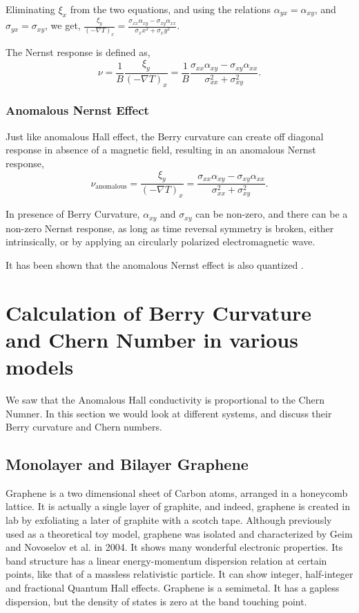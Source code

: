 \documentclass{report}
\begin{document}
Eliminating $\xi_x$ from the two equations, and using the relations $\alpha_{y x} = \alpha_{x y}$, and $\sigma_{y x} = \sigma_{x y}$, we get, $\frac{\xi_y}{(-\nabla T)_x} = \frac{\sigma_{xx} \alpha_{xy} - \sigma_{xy} \alpha_{xx}}{\sigma_xx ^2 + \sigma_xy ^2}$.

The Nernst response is defined \cite{Ussishkin_2002} as,
$$\nu = \frac{1}{B} \frac{\xi_y}{(-\nabla T)_x} = \frac{1}{B} \frac{\sigma_{xx} \alpha_{xy} - \sigma_{xy} \alpha_{xx}}{\sigma_{xx} ^2 + \sigma_{xy} ^2}.$$



\subsection{Anomalous Nernst Effect}
Just like anomalous Hall effect, the Berry curvature can create off diagonal response in absence of a magnetic field, resulting in an anomalous Nernst response,
$$\nu_\text{anomalous} = \frac{\xi_y}{(-\nabla T)_x} = \frac{\sigma_{xx} \alpha_{xy} - \sigma_{xy} \alpha_{xx}}{\sigma_{xx} ^2 + \sigma_{xy} ^2}.$$

In presence of Berry Curvature, $\alpha_{xy}$ and $\sigma_{xy}$ can be non-zero, and there can be a non-zero Nernst response, as long as time reversal symmetry is broken, either intrinsically, or by applying an circularly polarized electromagnetic wave.

It has been shown that the anomalous Nernst effect is also quantized \cite{QuantizedNernstNoky_2021}.
\chapter{Calculation of Berry Curvature and Chern Number in various models}\label{chap:ChernNumber}
We saw that the Anomalous Hall conductivity is proportional to the Chern Numner. In this section we would look at different systems, and discuss their Berry curvature and Chern numbers.
\section{Monolayer and Bilayer Graphene}
Graphene is a two dimensional sheet of Carbon atoms, arranged in a honeycomb lattice. It is actually a single layer of graphite, and indeed, graphene is created in lab by exfoliating a later of graphite with a scotch tape. Although previously used as a theoretical toy model, graphene was isolated and characterized by Geim and Novoselov et al. \cite{NovoselovGeimGraphene666} in 2004. It shows many wonderful electronic properties. Its band structure has a linear energy-momentum dispersion \cite{NovoselovGrapheneDirac2005} relation at certain points, like that of a massless relativistic particle. It can show integer, half-integer \cite{Zhang2005GrapheneQHEBerry} and fractional \cite{Bolotin2009GrapheneFQHE} Quantum Hall effects. Graphene is a semimetal. It has a gapless dispersion, but the density of states is zero at the band touching point.
\end{document}
